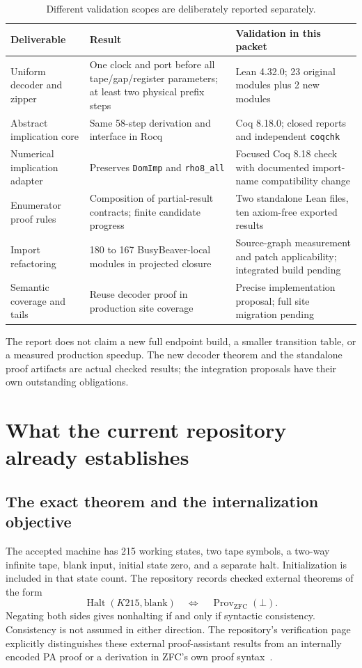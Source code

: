 \documentclass[11pt,letterpaper]{article}
\newcommand{\code}[1]{\texttt{\small #1}}
\begin{document}
\begin{table}[ht]
\centering\small
\begin{tabularx}{\textwidth}{@{}p{}Xp{}@{}}
\toprule
Deliverable & Result & Validation in this packet\\
\midrule
Uniform decoder and zipper & One clock and port before all tape/gap/register parameters;
at least two physical prefix steps & Lean 4.32.0; 23 original modules plus 2 new modules\\
Abstract implication core & Same 58-step derivation and interface in Rocq & Coq 8.18.0;
closed reports and independent \code{coqchk}\\
Numerical implication adapter & Preserves \code{DomImp} and \code{rho8\_all} & Focused Coq
8.18 check with documented import-name compatibility change\\
Enumerator proof rules & Composition of partial-result contracts; finite candidate progress &
Two standalone Lean files, ten axiom-free exported results\\
Import refactoring & 180 to 167 BusyBeaver-local modules in projected closure & Source-graph
measurement and patch applicability; integrated build pending\\
Semantic coverage and tails & Reuse decoder proof in production site coverage & Precise
implementation proposal; full site migration pending\\
\bottomrule
\end{tabularx}
\caption{Different validation scopes are deliberately reported separately.}
\end{table}

The report does not claim a new full endpoint build, a smaller transition table, or a
measured production speedup. The new decoder theorem and the standalone proof artifacts
are actual checked results; the integration proposals have their own outstanding obligations.

\section{What the current repository already establishes}

\subsection{The exact theorem and the internalization objective}

The accepted machine has 215 working states, two tape symbols, a two-way infinite tape,
blank input, initial state zero, and a separate halt. Initialization is included in that
state count. The repository records checked external theorems of the form
\[
  \operatorname{Halt}(K215,\mathrm{blank})
  \quad\Longleftrightarrow\quad
  \operatorname{Prov}_{\mathrm{ZFC}}(\bot).
\]
Negating both sides gives nonhalting if and only if syntactic consistency. Consistency
is not assumed in either direction. The repository's verification page explicitly
distinguishes these external proof-assistant results from an internally encoded PA
proof or a derivation in ZFC's own proof syntax~\cite{verification}.
\end{document}
